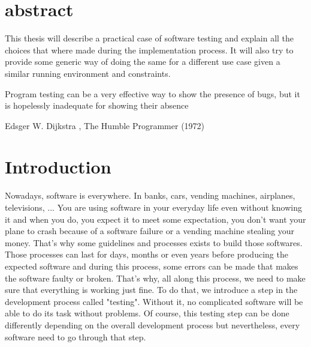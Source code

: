 \documentclass[12pt]{article}
\theoremstyle{definition}
\theoremstyle{definition}
\theoremstyle{remark}
\begin{document}



\section*{abstract}

This thesis will describe a practical case of software testing and explain all the choices that where made during the implementation process. It will also try to provide some generic way of doing the same for a different use case given a similar running environment and constraints.

\clearpage
\pagebreak
\hspace{0pt}
\vfill
\epigraph{Program testing can be a very effective way to show the presence of bugs, but it is hopelessly inadequate for showing their absence}{Edsger W. Dijkstra , The Humble Programmer (1972)}
\vfill
\hspace{0pt}
\pagebreak

\clearpage

\tableofcontents

\clearpage

\section{Introduction}

Nowadays, software is everywhere. In banks, cars, vending machines, airplanes, televisions, ... You are using software in your everyday life even without knowing it and when you do, you expect it to meet some expectation, you don't want your plane to crash because of a software failure or a vending machine stealing your money. That's why some guidelines and processes exists to build those softwares. Those processes can last for days, months or even years before producing the expected software and during this process, some errors can be made that makes the software faulty or broken. That's why, all along this process, we need to make sure that everything is working just fine. To do that, we introduce a step in the development process called "testing". Without it, no complicated software will be able to do its task without problems. Of course, this testing step can be done differently depending on the overall development process but nevertheless, every software need to go through that step.\\
\end{document}
